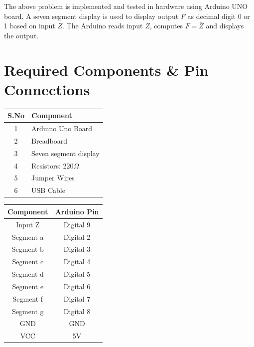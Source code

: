 \documentclass[a4paper,12pt]{article}
\begin{document}
The above problem is implemented and tested in hardware using Arduino UNO board.  
A seven segment display is used to display output $F$ as decimal digit 0 or 1 based on input $Z$.  
The Arduino reads input $Z$, computes $F=\bar Z$ and displays the output.

\section*{Required Components \& Pin Connections}

\begin{center}
\begin{minipage}{0.45\textwidth}
\begin{table}[H]
\centering
\begin{tabular}{|c|l|}
\hline
\textbf{S.No} & \textbf{Component} \\ \hline
1 & Arduino Uno Board \\
2 & Breadboard \\
3 & Seven segment display \\
4 & Resistors: 220$\Omega$ \\
5 & Jumper Wires \\
6 & USB Cable \\
\hline
\end{tabular}
\end{table}
\end{minipage}
\hspace{0.05\textwidth}
\begin{minipage}{0.45\textwidth}
\begin{table}[H]
\centering
\begin{tabular}{|c|c|}
\hline
\textbf{Component} & \textbf{Arduino Pin} \\ \hline
Input Z & Digital 9 \\
Segment a & Digital 2 \\
Segment b & Digital 3 \\
Segment c & Digital 4 \\
Segment d & Digital 5 \\
Segment e & Digital 6 \\
Segment f & Digital 7 \\
Segment g & Digital 8 \\
GND & GND \\
VCC & 5V \\
\hline
\end{tabular}
\end{table}
\end{minipage}
\end{center}
\end{document}
